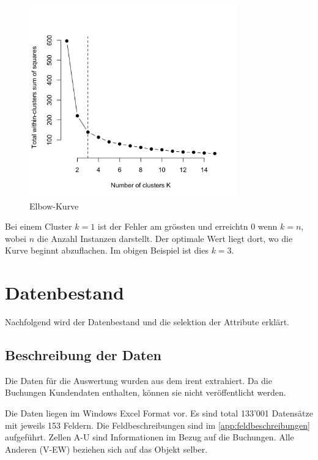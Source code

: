 \begin{figure}[H]
	\RawFloats
	\centering
	\includegraphics[width=0.8\textwidth]{images/elbow-curve.png}
	\caption{Elbow-Kurve}
	\label{fig:konzept:parameterauswahl:kprototypes}
\end{figure}

Bei einem Cluster $k=1$ ist der Fehler am grössten und erreichtn 0 wenn $k=n$, wobei $n$ die Anzahl Instanzen darstellt. Der optimale Wert liegt dort, wo die Kurve beginnt abzuflachen. Im obigen Beispiel ist dies $k=3$.

\section{Datenbestand}
\label{sec:recherche:datenbestand}
Nachfolgend wird der Datenbestand und die selektion der Attribute erklärt.

\subsection{Beschreibung der Daten}
\label{sec:recherche:datenbeschaffung}
Die Daten für die Auswertung wurden aus dem \gls{irent} extrahiert. Da die Buchungen Kundendaten enthalten, können sie nicht veröffentlicht werden.

Die Daten liegen im Windows Excel Format vor. Es sind total 133'001 Datensätze mit jeweils 153 Feldern. Die Feldbeschreibungen sind im \cref{app:feldbeschreibungen} aufgeführt. Zellen A-U sind Informationen im Bezug auf die Buchungen. Alle Anderen (V-EW) beziehen sich auf das Objekt selber.

